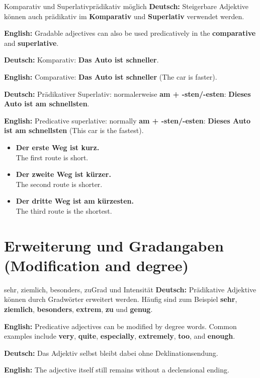\documentclass[a4paper,11pt]{article}
\newcommand{\GermanText}[1]{\textbf{Deutsch: }#1\par}
\newcommand{\EnglishText}[1]{{\small\color{SoftGray}\textbf{English: }#1\par}}
\newcommand{\ExampleItem}[2]{\item \textbf{#1}\\{\small\color{SoftGray}#2}}
\begin{document}
        \begin{grammarentry}{Komparativ und Superlativ}{prädikativ möglich}
            \GermanText{Steigerbare Adjektive können auch prädikativ im \textbf{Komparativ} und \textbf{Superlativ} verwendet werden.}
            \EnglishText{Gradable adjectives can also be used predicatively in the \textbf{comparative} and \textbf{superlative}.}

            \GermanText{Komparativ: \textbf{Das Auto ist schneller}.}
            \EnglishText{Comparative: \textbf{Das Auto ist schneller} (The car is faster).}

            \GermanText{Prädikativer Superlativ: normalerweise \textbf{am + -sten/-esten}: \textbf{Dieses Auto ist am schnellsten}.}
            \EnglishText{Predicative superlative: normally \textbf{am + -sten/-esten}: \textbf{Dieses Auto ist am schnellsten} (This car is the fastest).}
        \end{grammarentry}

        \begin{exbox}
            \begin{itemize}
                \ExampleItem{Der erste Weg ist kurz.}{The first route is short.}
                \ExampleItem{Der zweite Weg ist kürzer.}{The second route is shorter.}
                \ExampleItem{Der dritte Weg ist am kürzesten.}{The third route is the shortest.}
            \end{itemize}
        \end{exbox}

    \section{Erweiterung und Gradangaben \textnormal{(Modification and degree)}}

        \begin{grammarentry}{sehr, ziemlich, besonders, zu}{Grad und Intensität}
            \GermanText{Prädikative Adjektive können durch Gradwörter erweitert werden. Häufig sind zum Beispiel \textbf{sehr}, \textbf{ziemlich}, \textbf{besonders}, \textbf{extrem}, \textbf{zu} und \textbf{genug}.}
            \EnglishText{Predicative adjectives can be modified by degree words. Common examples include \textbf{very}, \textbf{quite}, \textbf{especially}, \textbf{extremely}, \textbf{too}, and \textbf{enough}.}

            \GermanText{Das Adjektiv selbst bleibt dabei ohne Deklinationsendung.}
            \EnglishText{The adjective itself still remains without a declensional ending.}
        \end{grammarentry}
\end{document}

